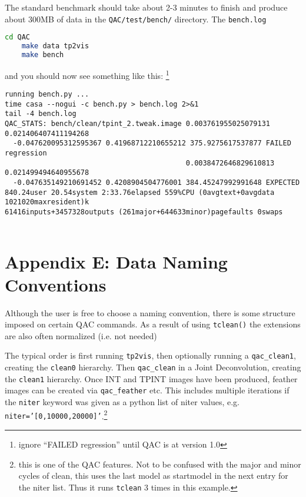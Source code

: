 \documentclass[12pt,a4paper]{article}
\begin{document}
The standard benchmark should take about 2-3 minutes to finish and produce about 300MB of
data in the \verb+QAC/test/bench/+ directory. The \verb+bench.log+

\begin{lstlisting}[language=bash]
    cd QAC
    make data tp2vis
    make bench
\end{lstlisting}

\noindent
and you should now see something like this:
\footnote{ignore ``FAILED regression'' until QAC is at version 1.0}

\footnotesize
\begin{verbatim}
running bench.py ...
time casa --nogui -c bench.py > bench.log 2>&1
tail -4 bench.log
QAC_STATS: bench/clean/tpint_2.tweak.image 0.003761955025079131 0.021406407411194268
  -0.047620095312595367 0.41968712210655212 375.9275617537877 FAILED regression
                                           0.0038472646829610813 0.021499494640955678
  -0.047635149210691452 0.4208904504776001 384.45247992991648 EXPECTED
840.24user 20.54system 2:33.76elapsed 559%CPU (0avgtext+0avgdata 1021020maxresident)k
61416inputs+3457328outputs (261major+644633minor)pagefaults 0swaps


\end{verbatim}
\normalsize


\newpage
\section*{Appendix E: Data Naming Conventions}

Although the user is free to choose a naming convention,
there is some structure imposed on certain QAC commands. As a result of using
\verb+tclean()+ the extensions are also often normalized (i.e. not needed)

The typical order is first running {\tt tp2vis}, then optionally running
a {\tt qac\_clean1}, creating the {\tt clean0} hierarchy. Then
{\tt qac\_clean} in a Joint Deconvolution, creating the {\tt clean1} hierarchy.
Once INT and TPINT images have been produced, feather images can be
created via {\tt qac\_feather} etc. This includes multiple iterations
if the {\tt niter} keyword was given as a python list of niter values,
e.g. {\tt niter='[0,10000,20000]'}.\footnote{this is one of the QAC
  features. Not to be confused with the major and minor cycles of clean,
  this uses the last model as startmodel in the next entry for the
  niter list. Thus it runs {\tt tclean} 3 times in this example.}
\end{document}
